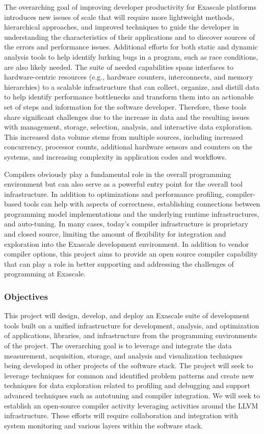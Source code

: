 The overarching goal of improving developer productivity for Exascale platforms introduces new issues of scale that will require more lightweight methods, hierarchical approaches, and improved techniques to guide the developer in understanding the characteristics of their applications and to discover sources of the errors and performance issues. Additional efforts for both static and dynamic analysis tools to help identify lurking bugs in a program, such as race conditions, are also likely needed. The suite of needed capabilities spans interfaces to hardware-centric resources (e.g., hardware counters, interconnects, and memory hierarchies) to a scalable infrastructure that can collect, organize, and distill data to help identify performance bottlenecks and transform them into an actionable set of steps and information for the software developer. Therefore, these tools share significant challenges due to the increase in data and the resulting issues with management, storage, selection, analysis, and interactive data exploration. This increased data volume stems from multiple sources, including increased concurrency, processor counts, additional hardware sensors and counters on the systems, and increasing complexity in application codes and workflows.

Compilers obviously play a fundamental role in the overall programming environment but can also serve as a powerful entry point for the overall tool infrastructure. In addition to optimizations and performance profiling, compiler-based tools can help with aspects of correctness, establishing connections between programming model implementations and the underlying runtime infrastructures, and auto-tuning. In many cases, today's compiler infrastructure is proprietary and closed source, limiting the amount of flexibility for integration and exploration into the Exascale development environment. In addition to vendor compiler options, this project aims to provide an open source compiler capability that can play a role in better supporting and addressing the challenges of programming at Exascale. 


\subsubsection{Objectives}

This project will design, develop, and deploy an Exascale suite of development tools built on a unified infrastructure for development, analysis, and optimization of applications, libraries, and infrastructure from the programming environments of the project. The overarching goal is to leverage and integrate the data measurement, acquisition, storage, and analysis and visualization techniques being developed in other projects of the software stack. The project will seek to leverage techniques for common and identified problem patterns and create new techniques for data exploration related to profiling and debugging and support advanced techniques such as autotuning and compiler integration. We will seek to establish an open-source compiler activity leveraging activities around the LLVM infrastructure. These efforts will require collaboration and integration with system monitoring and various layers within the software stack.


